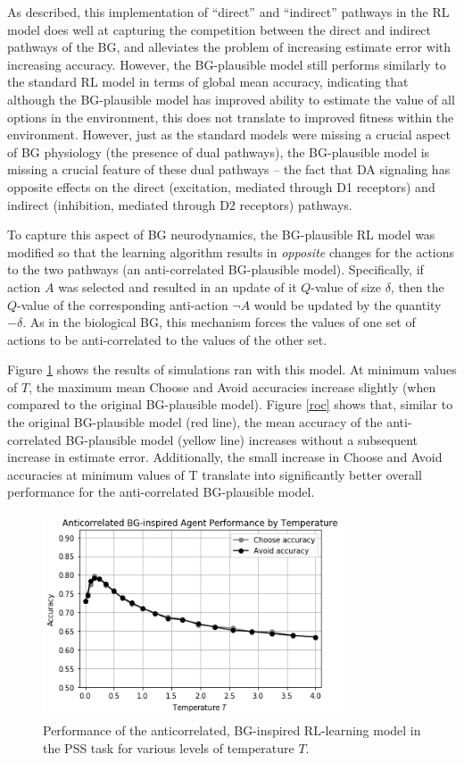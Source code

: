\documentclass[10pt,letterpaper]{article}
\begin{document}
As described, this implementation of ``direct'' and ``indirect'' pathways in the RL model does well at capturing the competition between the direct and indirect pathways of the BG, and alleviates the problem of increasing estimate error with increasing accuracy. However, the BG-plausible model still performs similarly to the standard RL model in terms of global mean accuracy, indicating that although the BG-plausible model has improved ability to estimate the value of all options in the environment, this does not translate to improved fitness within the environment. However, just as the standard models were missing a crucial aspect of BG physiology (the presence of dual pathways), the BG-plausible model is missing a crucial feature of these dual pathways -- the fact that DA signaling has opposite effects on the direct (excitation, mediated through D1 receptors) and indirect (inhibition, mediated through D2 receptors) pathways. 

To capture this aspect of BG neurodynamics, the BG-plausible RL model was modified so that the learning algorithm results in \emph{opposite} changes for the actions to the two pathways (an anti-correlated BG-plausible model). Specifically, if action $A$ was selected and resulted in an update  of it $Q$-value of size $\delta$, then the $Q$-value of the corresponding anti-action $\neg A$ would be updated by the quantity $-\delta$. As in the biological BG, this mechanism forces the values of one set of actions to be anti-correlated to the values of the other set.

Figure \ref{bg-anti-agent} shows the results of simulations ran with this model. At minimum values of $T$, the maximum mean Choose and Avoid accuracies increase slightly (when compared to the original BG-plausible model). Figure \ref{roc} shows that, similar to the original BG-plausible model (red line), the mean accuracy of the anti-correlated BG-plausible model (yellow line) increases without a subsequent increase in estimate error. Additionally, the small increase in Choose and Avoid accuracies at minimum values of T translate into significantly better overall performance for the anti-correlated BG-plausible model. 

\begin{figure}[ht]
	\begin{center}
		\includegraphics[width=3.5in]{bg-anti-agent-performance.png}
	\end{center}
	\caption{Performance of the anticorrelated, BG-inspired RL-learning model in the PSS task for various levels of temperature $T$.}
	\label{bg-anti-agent}
\end{figure}
\end{document}
